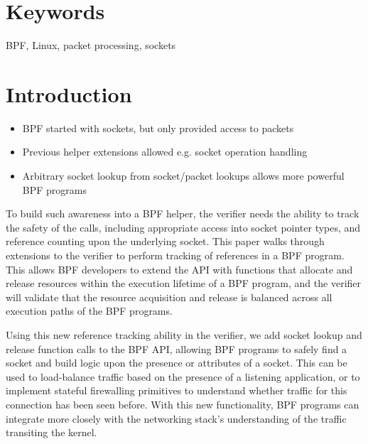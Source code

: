 \documentclass[10pt,sigconf,authorversion]{lpc}
\begin{document}
\section{Keywords}

BPF, Linux, packet processing, sockets

\section{Introduction}

\begin{itemize}
\item BPF started with sockets, but only provided access to packets
\item Previous helper extensions allowed e.g. socket operation handling
\item Arbitrary socket lookup from socket/packet lookups allows more powerful
      BPF programs
\end{itemize}


To build such awareness into a BPF helper, the verifier needs the ability to
track the safety of the calls, including appropriate access into socket pointer
types, and reference counting upon the underlying socket. This paper walks
through extensions to the verifier to perform tracking of references in a BPF
program. This allows BPF developers to extend the API with functions that
allocate and release resources within the execution lifetime of a BPF program,
and the verifier will validate that the resource acquisition and release is
balanced across all execution paths of the BPF programs.

Using this new reference tracking ability in the verifier, we add socket lookup
and release function calls to the BPF API, allowing BPF programs to safely find
a socket and build logic upon the presence or attributes of a socket. This can
be used to load-balance traffic based on the presence of a listening
application, or to implement stateful firewalling primitives to understand
whether traffic for this connection has been seen before. With this new
functionality, BPF programs can integrate more closely with the networking
stack's understanding of the traffic transiting the kernel.
\end{document}

